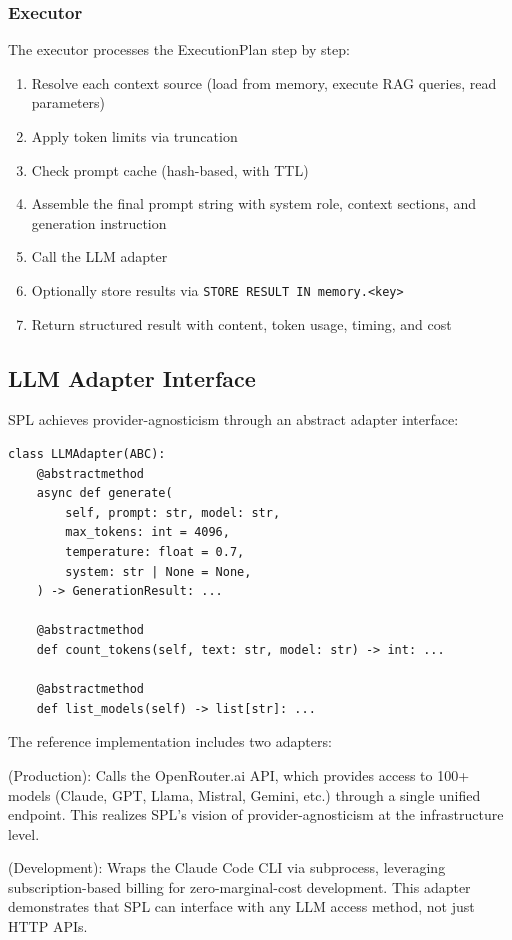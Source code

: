 \documentclass[11pt,a4paper]{article}
\begin{document}
\subsubsection{Executor}

The executor processes the ExecutionPlan step by step:

\begin{enumerate}[nosep]
  \item Resolve each context source (load from memory, execute RAG queries, read parameters)
  \item Apply token limits via truncation
  \item Check prompt cache (hash-based, with TTL)
  \item Assemble the final prompt string with system role, context sections, and generation instruction
  \item Call the LLM adapter
  \item Optionally store results via \texttt{STORE RESULT IN memory.<key>}
  \item Return structured result with content, token usage, timing, and cost
\end{enumerate}

\subsection{LLM Adapter Interface}

SPL achieves provider-agnosticism through an abstract adapter interface:

\begin{lstlisting}[style=python, caption={LLM adapter interface (Python)}]
class LLMAdapter(ABC):
    @abstractmethod
    async def generate(
        self, prompt: str, model: str,
        max_tokens: int = 4096,
        temperature: float = 0.7,
        system: str | None = None,
    ) -> GenerationResult: ...

    @abstractmethod
    def count_tokens(self, text: str, model: str) -> int: ...

    @abstractmethod
    def list_models(self) -> list[str]: ...
\end{lstlisting}

The reference implementation includes two adapters:

\begin{description}[nosep]
  \item[OpenRouter Adapter] (Production): Calls the OpenRouter.ai API, which provides access to 100+ models (Claude, GPT, Llama, Mistral, Gemini, etc.) through a single unified endpoint. This realizes SPL's vision of provider-agnosticism at the infrastructure level.
  \item[Claude CLI Adapter] (Development): Wraps the Claude Code CLI via subprocess, leveraging subscription-based billing for zero-marginal-cost development. This adapter demonstrates that SPL can interface with any LLM access method, not just HTTP APIs.
\end{description}
\end{document}
